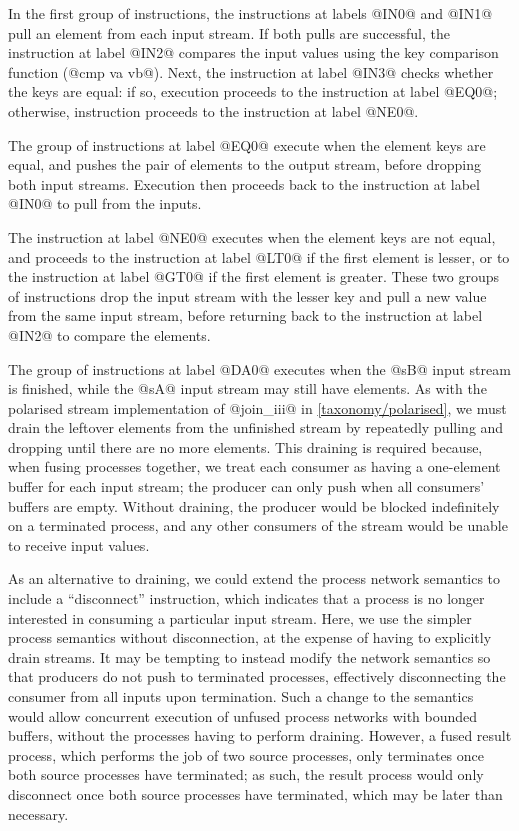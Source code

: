 In the first group of instructions, the instructions at labels @IN0@ and @IN1@ pull an element from each input stream.
If both pulls are successful, the instruction at label @IN2@ compares the input values using the key comparison function (@cmp va vb@).
Next, the instruction at label @IN3@ checks whether the keys are equal: if so, execution proceeds to the instruction at label @EQ0@; otherwise, instruction proceeds to the instruction at label @NE0@.

The group of instructions at label @EQ0@ execute when the element keys are equal, and pushes the pair of elements to the output stream, before dropping both input streams.
Execution then proceeds back to the instruction at label @IN0@ to pull from the inputs.

The instruction at label @NE0@ executes when the element keys are not equal, and proceeds to the instruction at label @LT0@ if the first element is lesser, or to the instruction at label @GT0@ if the first element is greater.
These two groups of instructions drop the input stream with the lesser key and pull a new value from the same input stream, before returning back to the instruction at label @IN2@ to compare the elements.

The group of instructions at label @DA0@ executes when the @sB@ input stream is finished, while the @sA@ input stream may still have elements.
As with the polarised stream implementation of @join_iii@ in \cref{taxonomy/polarised}, we must drain the leftover elements from the unfinished stream by repeatedly pulling and dropping until there are no more elements.
This draining is required because, when fusing processes together, we treat each consumer as having a one-element buffer for each input stream; the producer can only push when all consumers' buffers are empty.
Without draining, the producer would be blocked indefinitely on a terminated process, and any other consumers of the stream would be unable to receive input values.

As an alternative to draining, we could extend the process network semantics to include a ``disconnect'' instruction, which indicates that a process is no longer interested in consuming a particular input stream.
Here, we use the simpler process semantics without disconnection, at the expense of having to explicitly drain streams.
It may be tempting to instead modify the network semantics so that producers do not push to terminated processes, effectively disconnecting the consumer from all inputs upon termination.
Such a change to the semantics would allow concurrent execution of unfused process networks with bounded buffers, without the processes having to perform draining.
However, a fused result process, which performs the job of two source processes, only terminates once both source processes have terminated; as such, the result process would only disconnect once both source processes have terminated, which may be later than necessary.

